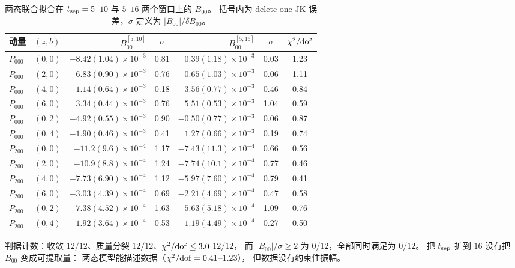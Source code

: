 \documentclass[UTF8,a4paper,11pt]{ctexart}
\begin{document}
\begin{table}[htbp]
\centering
\caption{两态联合拟合在 $t_{\rm sep}=5$--$10$ 与 $5$--$16$ 两个窗口上的 $B_{00}$。
括号内为 delete-one JK 误差，$\sigma$ 定义为 $|B_{00}|/\delta B_{00}$。}
\label{tab:b00tsep16}
\footnotesize
\begin{tabular}{@{}llrcrcc@{}}
\toprule
动量 & $(z,b)$ & $B_{00}^{[5,10]}$ & $\sigma$ & $B_{00}^{[5,16]}$ & $\sigma$ & $\chi^2/{\rm dof}$ \\
\midrule
$P_{000}$ & $(0,0)$ & $-8.42(1.04)\times10^{-3}$ & 0.81 & $0.39(1.18)\times10^{-3}$ & 0.03 & 1.23 \\
$P_{000}$ & $(2,0)$ & $-6.83(0.90)\times10^{-3}$ & 0.76 & $0.65(1.03)\times10^{-3}$ & 0.06 & 1.11 \\
$P_{000}$ & $(4,0)$ & $-1.14(0.64)\times10^{-3}$ & 0.18 & $3.56(0.77)\times10^{-3}$ & 0.46 & 0.84 \\
$P_{000}$ & $(6,0)$ & $3.34(0.44)\times10^{-3}$ & 0.76 & $5.51(0.53)\times10^{-3}$ & 1.04 & 0.59 \\
$P_{000}$ & $(0,2)$ & $-4.92(0.55)\times10^{-3}$ & 0.90 & $-0.50(0.77)\times10^{-3}$ & 0.06 & 0.87 \\
$P_{000}$ & $(0,4)$ & $-1.90(0.46)\times10^{-3}$ & 0.41 & $1.27(0.66)\times10^{-3}$ & 0.19 & 0.74 \\
$P_{200}$ & $(0,0)$ & $-11.2(9.6)\times10^{-4}$ & 1.17 & $-7.43(11.3)\times10^{-4}$ & 0.66 & 0.56 \\
$P_{200}$ & $(2,0)$ & $-10.9(8.8)\times10^{-4}$ & 1.24 & $-7.74(10.1)\times10^{-4}$ & 0.77 & 0.46 \\
$P_{200}$ & $(4,0)$ & $-7.73(6.90)\times10^{-4}$ & 1.12 & $-5.97(7.60)\times10^{-4}$ & 0.79 & 0.41 \\
$P_{200}$ & $(6,0)$ & $-3.03(4.39)\times10^{-4}$ & 0.69 & $-2.21(4.69)\times10^{-4}$ & 0.47 & 0.58 \\
$P_{200}$ & $(0,2)$ & $-7.38(4.52)\times10^{-4}$ & 1.63 & $-5.63(5.18)\times10^{-4}$ & 1.09 & 0.76 \\
$P_{200}$ & $(0,4)$ & $-1.92(3.64)\times10^{-4}$ & 0.53 & $-1.19(4.49)\times10^{-4}$ & 0.27 & 0.50 \\
\bottomrule
\end{tabular}
\end{table}

判据计数：收敛 $12/12$、质量分裂 $12/12$、$\chi^2/{\rm dof}\le3.0$ $12/12$，
而 $|B_{00}|/\sigma\ge2$ 为 $0/12$，全部同时满足为 $0/12$。
把 $t_{\rm sep}$ 扩到 $16$ 没有把 $B_{00}$ 变成可提取量：
两态模型能描述数据（$\chi^2/{\rm dof}=0.41$--$1.23$），
但数据没有约束住振幅。
\end{document}
